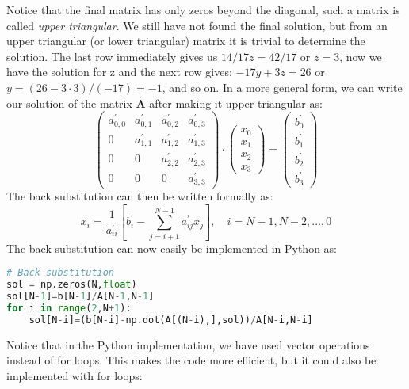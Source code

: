 \documentclass[graybox,sectrefs,envcountresetchap,open=right,final]{svmonodo}
\begin{document}
Notice that the final matrix has only zeros beyond the diagonal, such a matrix is called \emph{upper triangular}. We still have not found the final solution, but from an upper triangular (or lower triangular) matrix it is trivial to determine the solution. The last row immediately gives us $14/17z=42/17$ or $z=3$, now we have the solution for z and the next row gives: $-17y+3z=26$ or $y=(26-3\cdot3)/(-17)=-1$, and so on. In a more general form, we can write our solution of the matrix $\mathbf{A}$ after making it upper triangular as:
\begin{equation}
\begin{pmatrix}
a^\prime_{0,0}&a^\prime_{0,1}&a^\prime_{0,2}&a^\prime_{0,3}\\ 
0&a^\prime_{1,1}&a^\prime_{1,2}&a^\prime_{1,3}\\ 
0&0&a^\prime_{2,2}&a^\prime_{2,3}\\ 
0&0&0&a^\prime_{3,3}
\end{pmatrix}
\cdot
\begin{pmatrix}
x_0\\ 
x_1\\ 
x_2\\ 
x_3
\end{pmatrix}
=
\begin{pmatrix}
b^\prime_{0}\\ 
b^\prime_{1}\\ 
b^\prime_{2}\\ 
b^\prime_{3}
\end{pmatrix}
\label{eq:lin:back}
\end{equation}
The back substitution can then be written formally as:
\begin{equation}
x_i=\frac{1}{a^\prime_{ii}}\left[b_i^\prime-\sum_{j=i+1}^{N-1}a^\prime_{ij}x_j\right],\quad i=N-1,N-2,\ldots,0
\label{eq:lin:back2}
\end{equation}
The back substitution can now easily be implemented in Python as:






\begin{lstlisting}[language=python,style=blue1]
# Back substitution
sol = np.zeros(N,float)
sol[N-1]=b[N-1]/A[N-1,N-1]
for i in range(2,N+1):
    sol[N-i]=(b[N-i]-np.dot(A[(N-i),],sol))/A[N-i,N-i]

\end{lstlisting}

Notice that in the Python implementation, we have used vector operations instead of for loops. This makes the code more efficient, but it could also be implemented with for loops: 
\end{document}
